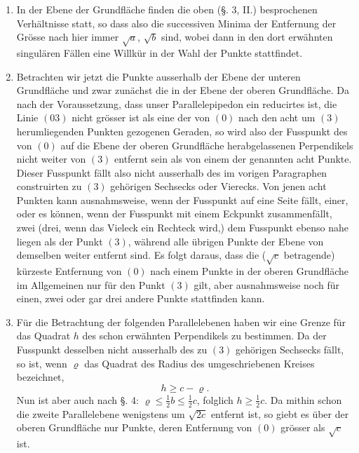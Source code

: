 \documentclass[11pt]{article}
\newcommand{\ord}[1]{#1$^{\circ}$}
\begin{document}
\begin{enumerate}
\item[\ord{1}.] In der Ebene der Grundfläche finden die oben (§. 3, II.) besprochenen Verhältnisse statt, so dass also die successiven Minima der Entfernung der Grösse nach hier immer $\sqrt a$, $\sqrt b$ sind, wobei dann in den dort erwähnten singulären Fällen eine Willkür in der Wahl der Punkte stattfindet.
\item[\ord{2}.] Betrachten wir jetzt die Punkte ausserhalb der Ebene der unteren Grundfläche und zwar zunächst die in der Ebene der oberen Grundfläche. Da nach der Voraussetzung, dass unser Parallelepipedon ein reducirtes ist, die Linie $(03)$ nicht grösser ist als eine der von $(0)$ nach den acht um $(3)$ herumliegenden Punkten gezogenen Geraden, so wird also der Fusspunkt des von $(0)$ auf die Ebene der oberen Grundfläche herabgelassenen Perpendikels nicht weiter von $(3)$ entfernt sein als von einem der genannten acht Punkte. Dieser Fusspunkt fällt also nicht ausserhalb des im vorigen Paragraphen construirten zu $(3)$ gehörigen Sechsecks oder Vierecks. Von jenen acht Punkten kann ausnahmsweise, wenn der Fusspunkt auf eine Seite fällt, einer, oder es können, wenn der Fusspunkt mit einem Eckpunkt zusammenfällt, zwei (drei, wenn das Vieleck ein Rechteck wird,) dem Fusspunkt ebenso nahe liegen als der Punkt $(3)$, während alle übrigen Punkte der Ebene von demselben weiter entfernt sind. Es folgt daraus, dass die ($\sqrt c$ betragende) kürzeste Entfernung von $(0)$ nach einem Punkte in der oberen Grundfläche im Allgemeinen nur für den Punkt $(3)$ gilt, aber ausnahmsweise noch für einen, zwei oder gar drei andere Punkte stattfinden kann.
\item[\ord{3}.] Für die Betrachtung der folgenden Parallelebenen haben wir eine Grenze für das Quadrat $h$ des schon erwähnten Perpendikels zu bestimmen. Da der Fusspunkt desselben nicht ausserhalb des zu $(3)$ gehörigen Sechsecks fällt, so ist, wenn $\varrho$ das Quadrat des Radius des umgeschriebenen Kreises bezeichnet,
\[
 h\ge c-\varrho.
\]
Nun ist aber auch nach §. 4: $\varrho\le\frac12 b\le\frac12 c$, folglich $h\ge\frac12 c$. Da mithin schon die zweite Parallelebene wenigstens um $\sqrt{2c}$ entfernt ist, so giebt es über der oberen Grundfläche nur Punkte, deren Entfernung von $(0)$ grösser als $\sqrt c$ ist.
\end{enumerate}
\end{document}
